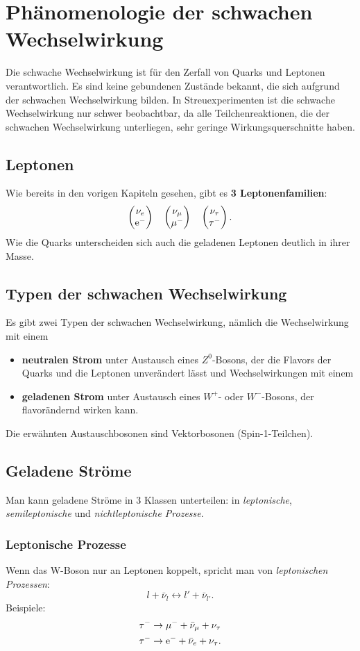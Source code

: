 \chapter{Phänomenologie der schwachen Wechselwirkung}
Die schwache Wechselwirkung ist für den Zerfall von Quarks und Leptonen verantwortlich.
Es sind keine gebundenen Zustände bekannt, die sich aufgrund der schwachen Wechselwirkung bilden.
In Streuexperimenten ist die schwache Wechselwirkung nur schwer beobachtbar, da alle Teilchenreaktionen, die der schwachen Wechselwirkung unterliegen, sehr geringe Wirkungsquerschnitte haben.

\section{Leptonen}
Wie bereits in den vorigen Kapiteln gesehen, gibt es \textbf{3 Leptonenfamilien}:
\begin{equation*}
	\begin{pmatrix} \nu_e \\ \text{e}^- \end{pmatrix}\quad\begin{pmatrix} \nu_\mu \\ \mu^- \end{pmatrix}\quad\begin{pmatrix} \nu_\tau \\ \tau^- \end{pmatrix}.
\end{equation*}
Wie die Quarks unterscheiden sich auch die geladenen Leptonen deutlich in ihrer Masse.

\section{Typen der schwachen Wechselwirkung}
Es gibt zwei Typen der schwachen Wechselwirkung, nämlich die Wechselwirkung mit einem
\begin{itemize}
	\item \textbf{neutralen Strom} unter Austausch eines $Z^0$-Bosons, der die Flavors der Quarks und die Leptonen unverändert lässt und Wechselwirkungen mit einem
	\item \textbf{geladenen Strom} unter Austausch eines $W^+$- oder $W^-$-Bosons, der flavorändernd wirken kann.
\end{itemize}

Die erwähnten Austauschbosonen sind Vektorbosonen (Spin-1-Teilchen).

\section{Geladene Ströme}
Man kann geladene Ströme in 3 Klassen unterteilen: in \textit{leptonische}, \textit{semileptonische} und \textit{nichtleptonische Prozesse}.

\subsection{Leptonische Prozesse}
Wenn das W-Boson nur an Leptonen koppelt, spricht man von \textit{leptonischen Prozessen}:
\begin{equation*}
	l + \bar{\nu}_l \longleftrightarrow l' + \bar{\nu}_{l'}.
\end{equation*}
Beispiele:
\begin{align*}
	\tau^- &\rightarrow \mu^- + \bar{\nu}_\mu + \nu_\tau \\
	\tau^- &\rightarrow \text{e}^- + \bar{\nu}_e + \nu_\tau.
\end{align*}

